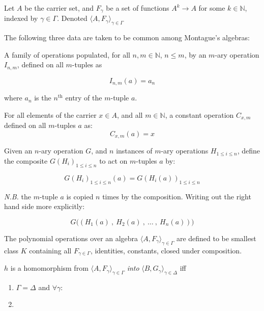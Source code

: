 \begin{defn}\label{algdata} 
Let $A$ be the carrier set, and $F_\gamma$ be a set of functions $A^k \rightarrow A$ for some $k \in \mathbb{N}$, indexed by $\gamma \in \Gamma$. Denoted $\langle A, F_\gamma \rangle_{\gamma \in \Gamma}$
\end{defn}

The following three data are taken to be common among Montague's algebras:

\begin{defn}[Identities]\label{ids} 
A family of operations populated, for all $n, m \in \mathbb{N}$, $n \leq m$, by an $m$-ary operation $I_{n,m}$, defined on all $m$-tuples as

$$I_{n,m}(a) = a_n$$

where $a_n$ is the $n^{\text{th}}$ entry of the $m$-tuple $a$.
\end{defn}


\begin{defn}[Constants]\label{constants}
For all elements of the carrier $x \in A$, and all $m \in \mathbb{N}$, a constant operation $C_{x,m}$ defined on all $m$-tuples $a$ as:
$$C_{x,m}(a) = x$$
\end{defn}

\begin{defn}[Composition]\label{comp}
Given an $n$-ary operation $G$, and $n$ instances of $m$-ary operations $H_{1 \leq i \leq n}$, define the composite $G(H_i)_{1 \leq i \leq n}$ to act on $m$-tuples $a$ by:

$$G(H_i)_{1 \leq i \leq n}(a) = G(H_i(a))_{1 \leq i \leq n}$$

\emph{N.B.} the $m$-tuple $a$ is copied $n$ times by the composition. Writing out the right hand side more explicitly:

$$G\bigg( \ \big( \ H_1(a) \ , \ H_2(a) \ , \ \ldots \ , \ H_n(a) \ \big) \  \bigg)$$
\end{defn}

\begin{defn}\label{polyop}
The polynomial operations over an algebra $\langle A, F_\gamma \rangle_{\gamma \in \Gamma}$ are defined to be smallest class $K$ containing all $F_{\gamma \in \Gamma}$, identities, constants, closed under composition.
\end{defn}

\begin{defn}\label{homo}
$h$ is a homomorphism from $\langle A, F_\gamma \rangle_{\gamma \in \Gamma}$ \emph{into} $\langle B, G_\gamma \rangle_{\gamma \in \Delta}$ iff
\begin{enumerate}
    \item{$\Gamma = \Delta$ and $\forall \gamma : $}
    \item{}
\end{enumerate}
\end{defn}

